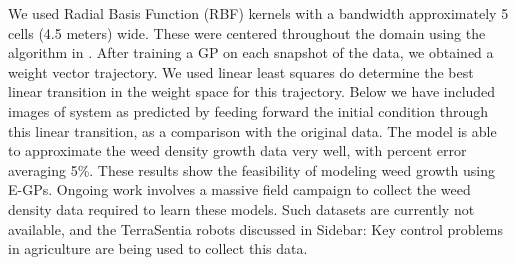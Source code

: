 \documentclass[letterpaper,12pt,peerreviewca,draftcls]{IEEEtran}
\begin{document}
We used Radial Basis Function (RBF) kernels with a bandwidth approximately 5 cells (4.5 meters) wide. These were centered throughout the domain using the algorithm in \cite{csato2001sparse}. After training a GP on each snapshot of the data, we obtained a weight vector trajectory. We used linear least squares do determine the best linear transition in the weight space for this trajectory. Below we have included images of system as predicted by feeding forward the initial condition through this linear transition, as a comparison with the original data. The model is able to approximate the weed density growth data very well, with percent error averaging 5\%. These results show the feasibility of modeling weed growth using E-GPs. Ongoing work involves a massive field campaign to collect the weed density data required to learn these models. Such datasets are currently not available, and the TerraSentia robots discussed in Sidebar: Key control problems in agriculture are being used to collect this data.
\end{document}
